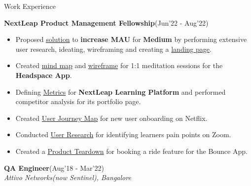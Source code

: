 \documentclass{resume}
\newcommand{\sepval}{-0.5em}
\begin{document}
\begin{rSection}{Work Experience}
\vspace{-.4cm}
 
\item{\bf {\bf NextLeap Product Management Fellowship}}\hfill{(Jun'22 - Aug'22)}\\
[-0.4cm]

\begin{itemize}[leftmargin=*]

	\itemsep \sepval

	\item Proposed \href{https://drive.google.com/drive/u/0/folders/1WsIuj0mg7Tzor1ZqkgHoIVEpC83IzDQO}{solution} to {\bf increase MAU} for {\bf Medium} by performing extensive user research, ideating, wireframing and creating a \href{https://mediummau.unicornplatform.page/}{landing page}. 

	\item Created \href{https://drive.google.com/file/d/1-avX66iiwxiya52PV7Py78P-dR9KBc26/view?usp=sharing}{mind map} and \href{https://drive.google.com/file/d/1Q1WOr4dA-qPECZdUN8NicpNdlkdFcFjl/view?usp=sharing}{wireframe} for 1:1 meditation sessions for the {\bf Headspace App}. 

	\item Defining \href{https://drive.google.com/file/d/1-avX66iiwxiya52PV7Py78P-dR9KBc26/view?usp=sharing}{Metrics} for {\bf NextLeap Learning Platform} and performed competitor analysis for its portfolio page.

	\item Created \href{https://drive.google.com/file/d/1-avX66iiwxiya52PV7Py78P-dR9KBc26/view?usp=sharing}{User Journey Map} for new user onboarding on Netflix.

	\item Conducted \href{https://drive.google.com/file/d/1-avX66iiwxiya52PV7Py78P-dR9KBc26/view?usp=sharing}{User Research} for identifying learners pain points on Zoom.

	\item Created a \href{https://drive.google.com/file/d/1KT8zrRtvo1okBxOsbrlV3yusbd8QLe2w/view?usp=sharing}{Product Teardown}  for booking a ride feature for the Bounce App.

\end{itemize}

 
\item{\bf {\bf QA Engineer}}\hfill{(Aug'18 - Mar'22)}\\
	\emph{Attivo Networks(now Sentinel), Bangalore}\\
[-0.4cm]


\end{rSection}
\end{document}
